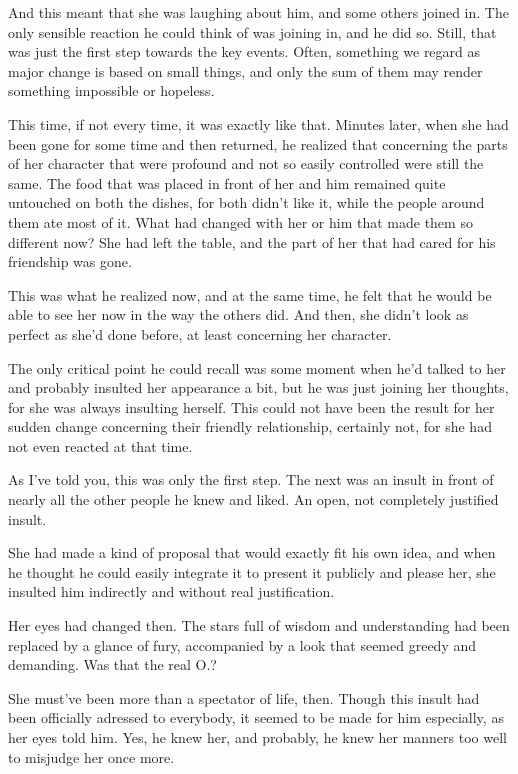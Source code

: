 And this meant that she was laughing about him, and some others joined in. The only sensible reaction he could think of was joining in, and he did so. Still, that was just the first step towards the key events. Often, something we regard as major change is based on small things, and only the sum of them may render something impossible or hopeless.

This time, if not every time, it was exactly like that. Minutes later, when she had been gone for some time and then returned, he realized that concerning the parts of her character that were profound and not so easily controlled were still the same. The food that was placed in front of her and him remained quite untouched on both the dishes, for both didn't like it, while the people around them ate most of it. What had changed with her or him that made them so different now? She had left the table, and the part of her that had cared for his friendship was gone.

This was what he realized now, and at the same time, he felt that he would be able to see her now in the way the others did. And then, she didn't look as perfect as she'd done before, at least concerning her character.

The only critical point he could recall was some moment when he'd talked to her and probably insulted her appearance a bit, but he was just joining her thoughts, for she was always insulting herself. This could not have been the result for her sudden change concerning their friendly relationship, certainly not, for she had not even reacted at that time.

As I've told you, this was only the first step. The next was an insult in front of nearly all the other people he knew and liked. 
An open, not completely justified insult.

She had made a kind of proposal that would exactly fit his own idea, and when he thought he could easily integrate it to present it publicly and please her, she insulted him indirectly and without real justification.

Her eyes had changed then. The stars full of wisdom and understanding had been replaced by a glance of fury, accompanied by a look that seemed greedy and demanding. Was that the real O.?

She must've been more than a spectator of life, then. Though this insult had been officially adressed to everybody, it seemed to be made for him especially, as her eyes told him. Yes, he knew her, and probably, he knew her manners too well to misjudge her once more.

